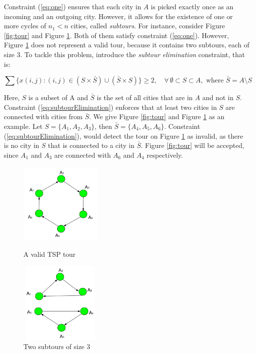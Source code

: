 \documentclass{mprop}
\theoremstyle{definition}
\begin{document}
Constraint (\ref{eq:one}) ensures that each city in $A$ is picked exactly once as an incoming and an outgoing city. However, it allows for the existence of one or more cycles of $n_{1} < n$ cities, called \textit{subtours}. For instance, consider Figure \ref{fig:tour} and Figure \ref{fig:subtours}. Both of them satisfy constraint (\ref{eq:one}). However, Figure \ref{fig:subtours} does not represent a valid tour, because it contains two subtours, each of size 3. To tackle this problem, \citet{Dantzig54} introduce the \textit{subtour elimination} constraint, that is:

\begin{equation}
\label{eq:subtourElimination}
\sum \{x(i,j) : (i,j) \in (S \times \bar{S}) \cup (\bar{S} \times S)\} \geq 2, \quad \forall \, \emptyset \subset S \subset A, \textrm{ where } \bar{S} = A \setminus S
\end{equation}

Here, $S$ is a subset of A and $\bar{S}$ is the set of all cities that are in $A$ and not in $S$. Constraint (\ref{eq:subtourElimination}) enforces that at least two cities in $S$ are connected with cities from $\bar{S}$. We give Figure \ref{fig:tour} and Figure \ref{fig:subtours} as an example. Let $S = \{A_{1},A_{2},A_{3}\}$, then $\bar{S} = \{A_{4},A_{5},A_{6}\}$. Constraint (\ref{eq:subtourElimination}), would detect the tour on Figure \ref{fig:subtours} as invalid, as there is no city in $S$ that is connected to a city in $\bar{S}$. Figure \ref{fig:tour} will be accepted, since $A_{1}$ and $A_{3}$ are connected with $A_{6}$ and $A_{4}$ respectively.

\begin{figure}
\centering
\begin{minipage}{.5\textwidth}
  \centering
  \includegraphics[width=4cm, height=4cm]{images/valid.png}
  \caption{A valid TSP tour}
  \label{fig:tour}
\end{minipage}%
\begin{minipage}{.5\textwidth}
  \centering
  \includegraphics[width=4cm, height=4cm]{images/invalid.png}
  \caption{Two subtours of size 3}
  \label{fig:subtours}
\end{minipage}
\end{figure}
\end{document}
